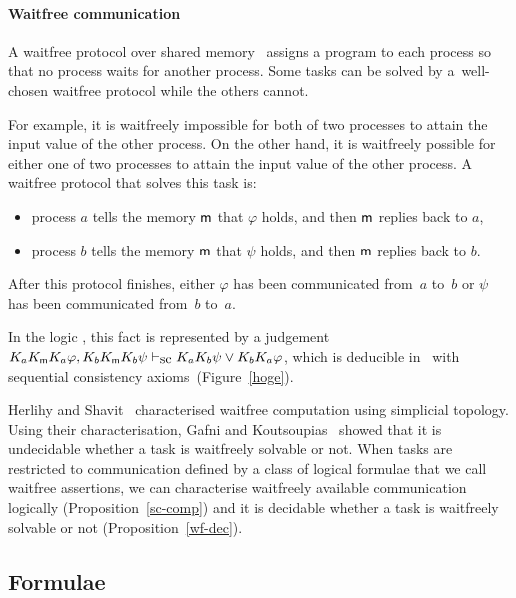     \paragraph{Waitfree communication}
    A waitfree protocol over shared memory~\cite{herlihy1991wait}
    assigns a program to each process so that no process waits for another process.
    Some tasks can be solved by a~well-chosen waitfree protocol while the others cannot.

    For example,
    it is waitfreely impossible for both of two processes to attain the input value of the other
    process.
    On the other hand, it is waitfreely possible for
    either one of two processes to attain the input value of the other process.
    A waitfree protocol that solves this task is:
    \begin{itemize}
     \item process $a$ tells the memory ${\sf m}$ that $\varphi$ holds, and then ${\sf m}$ replies back to $a$,
     \item process $b$ tells the memory ${\sf m}$ that $\psi$    holds, and then ${\sf m}$ replies back to $b$.
    \end{itemize}
    After this protocol finishes,
    either $\varphi$ has been communicated from~$a$ to~$b$
    or $\psi$ has
    been communicated from~$b$ to~$a$.

    In the
    logic \iec, this fact is represented by a judgement $K_aK_{\sf m}{}K_a\varphi,
    K_bK_{\sf m}{}K_b\psi\vdash_{\mbox{\rm sc}} K_aK_b\psi\vee K_bK_a\varphi$,
    which is deducible in \iec\, with
    sequential consistency axioms~(Figure~\ref{hoge}).

    Herlihy and Shavit~\cite{herlihy1999topological} characterised waitfree computation using
    simplicial topology.
    Using their characterisation,
    Gafni and Koutsoupias~\cite{gafni1999three}
    showed that it is undecidable whether a task is waitfreely solvable
    or not.
    When tasks are restricted to communication defined by
    a class of logical formulae that we call waitfree assertions,
    we can characterise waitfreely available communication logically (Proposition~\ref{sc-comp})
    and
    it is decidable whether a task is waitfreely solvable or not (Proposition~\ref{wf-dec}).



  \subsection{Formulae}

